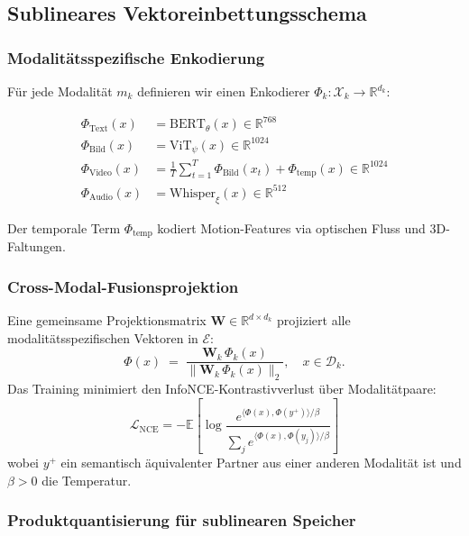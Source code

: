 ﻿\documentclass[12pt,a4paper]{article}
\begin{document}
\subsection{Sublineares Vektoreinbettungsschema}
\label{sec:embedding}

\subsubsection{Modalitätsspezifische Enkodierung}

Für jede Modalität $m_k$ definieren wir einen Enkodierer 
$\Phi_k: \mathcal{X}_k \to \mathbb{R}^{d_k}$:

\begin{align}
  \Phi_{\text{Text}}(x) &= \text{BERT}_\theta(x) \in \mathbb{R}^{768} \\
  \Phi_{\text{Bild}}(x) &= \text{ViT}_\psi(x) \in \mathbb{R}^{1024} \\
  \Phi_{\text{Video}}(x) &= \frac{1}{T}\sum_{t=1}^T \Phi_{\text{Bild}}(x_t) + 
                            \Phi_{\text{temp}}(x) \in \mathbb{R}^{1024}\\
  \Phi_{\text{Audio}}(x) &= \text{Whisper}_\xi(x) \in \mathbb{R}^{512}
\end{align}

Der temporale Term $\Phi_{\text{temp}}$ kodiert Motion-Features via 
optischen Fluss und 3D-Faltungen.

\subsubsection{Cross-Modal-Fusionsprojektion}

Eine gemeinsame Projektionsmatrix $\mathbf{W} \in \mathbb{R}^{d \times d_k}$ 
projiziert alle modalitätsspezifischen Vektoren in $\mathcal{E}$:
\[
  \Phi(x) \;=\; \frac{\mathbf{W}_k\, \Phi_k(x)}
                     {\|\mathbf{W}_k\, \Phi_k(x)\|_2},
  \quad x \in \mathcal{D}_k.
\]
Das Training minimiert den InfoNCE-Kontrastivverlust über Modalitätpaare:
\begin{equation}
  \mathcal{L}_{\text{NCE}} = -\mathbb{E}\left[
    \log \frac{e^{\langle \Phi(x), \Phi(y^+)\rangle/\beta}}
    {\sum_{j} e^{\langle \Phi(x), \Phi(y_j)\rangle/\beta}}
  \right]
  \label{eq:nce}
\end{equation}
wobei $y^+$ ein semantisch äquivalenter Partner aus einer anderen 
Modalität ist und $\beta > 0$ die Temperatur.

\subsubsection{Produktquantisierung für sublinearen Speicher}
\end{document}
